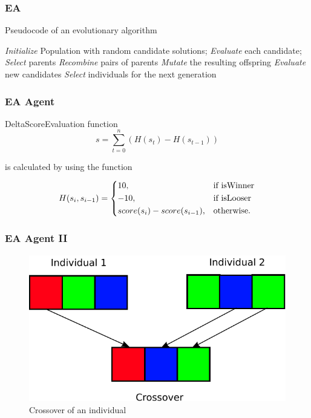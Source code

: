 \documentclass{beamer}
\begin{document}
\begin{frame}
\frametitle{EA}



\begin{algorithm}[H]
\caption{Pseudocode of an evolutionary algorithm }
\begin{algorithmic}[1]

\STATE \emph{Initialize} Population with random candidate solutions;
\STATE \emph{Evaluate} each candidate;
\STATE \emph{Select} parents 
\STATE \emph{Recombine} pairs of parents
\STATE \emph{Mutate} the resulting offspring
\STATE \emph{Evaluate} new candidates
\STATE \emph{Select} individuals for the next generation
\ENDWHILE

\end{algorithmic}

\label{alg:seq}
\end{algorithm}


\end{frame}





\begin{frame}
\frametitle{EA Agent}

DeltaScoreEvaluation function 
\begin{equation*}
s = \sum_{t=0}^n (H(s_t) - H(s_{t-1}))
\end{equation*}

is calculated by using the function

\begin{equation*}
    H(s_i, s_{i-1}) = 
\begin{dcases}
    10, & \text{if isWinner}  \\
    -10, & \text{if isLooser}  \\
    score(s_i) - score(s_{i-1}), & \text{otherwise.}
\end{dcases}
\end{equation*}
\end{frame}



\begin{frame}
\frametitle{EA Agent II}
\begin{figure}[H]
\centering
\includegraphics[scale=0.6]{../report/images/crossover.pdf}
\caption{Crossover of an individual}
\label{fig:crossover}
\end{figure}
\end{frame}
\end{document}
